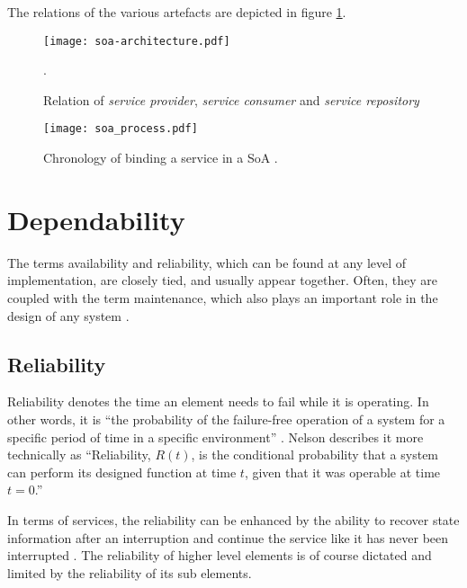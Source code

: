 The relations of the various artefacts are depicted in figure \ref{fig:soa_overview}.

\begin{figure}[!htbp]
\centering
\texttt{[image: soa-architecture.pdf]}
\caption{Relation of \emph{service provider}, \emph{service consumer} and \emph{service repository} \cite{arrowhead} \cite{converge}}.
\label{fig:soa_overview}
\end{figure}

\begin{figure}[!htbp]
\centering
\texttt{[image: soa\_process.pdf]}
\caption{Chronology of binding a service in a SoA \cite{converge}.}
\label{fig:service_cronology}
\end{figure}









\section{Dependability}

The terms availability and reliability, which can be found at any level of implementation, are closely tied, and usually appear together. Often, they are coupled with the term maintenance, which also plays an important role in the design of any system \cite[p.116]{genesys} \cite{lessner}.

\subsection{Reliability}
\label{sec:reliability}

Reliability denotes the time an element needs to fail while it is operating. In other words, it is ``the probability of the failure-free operation of a system for a specific period of time in a specific environment'' \cite[p.116]{genesys}. Nelson \cite{nelson} describes it more technically as ``Reliability, $R(t)$, is the conditional probability that a system can perform its designed function at time $t$, given that it was operable at time $t=0$.''

In terms of services, the reliability can be enhanced by the ability to recover state information after an interruption and continue the service like it has never been interrupted \cite{genesys}. The reliability of higher level elements is of course dictated and limited by the reliability of its sub elements.


